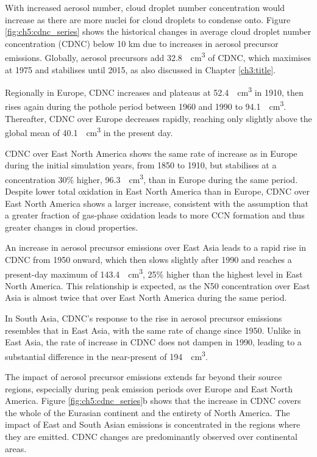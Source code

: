 With increased aerosol number, cloud droplet number concentration would increase as there are more nuclei for cloud droplets to condense onto. Figure \ref{fig:ch5:cdnc_series} shows the historical changes in average cloud droplet number concentration (CDNC) below 10 km due to increases in aerosol precursor emissions. Globally, aerosol precursors add \qty{32.8}{\per\cubic\centi\metre} of CDNC, which maximises at 1975 and stabilises until 2015, as also discussed in Chapter \ref{ch3:title}. 

Regionally in Europe, CDNC increases and plateaus at \qty{52.4}{\per\cubic\centi\metre} in 1910, then rises again during the pothole period between 1960 and 1990 to \qty{94.1}{\per\cubic\centi\metre}. Thereafter, CDNC over Europe decreases rapidly, reaching only slightly above the global mean of \qty{40.1}{\per\cubic\centi\metre} in the present day.

CDNC over East North America shows the same rate of increase as in Europe during the initial simulation years, from 1850 to 1910, but stabilises at a concentration 30\% higher, \qty{96.3}{\per\cubic\centi\metre}, than in Europe during the same period. Despite lower total oxidation in East North America than in Europe, CDNC over East North America shows a larger increase, consistent with the assumption that a greater fraction of gas-phase oxidation leads to more CCN formation and thus greater changes in cloud properties. 

An increase in aerosol precursor emissions over East Asia leads to a rapid rise in CDNC from 1950 onward, which then slows slightly after 1990 and reaches a present-day maximum of \qty{143.4}{\per\cubic\centi\metre}, 25\% higher than the highest level in East North America. This relationship is expected, as the N50 concentration over East Asia is almost twice that over East North America during the same period.

In South Asia, CDNC's response to the rise in aerosol precursor emissions resembles that in East Asia, with the same rate of change since 1950. Unlike in East Asia, the rate of increase in CDNC does not dampen in 1990, leading to a substantial difference in the near-present of \qty{194}{\per\cubic\centi\metre}.

The impact of aerosol precursor emissions extends far beyond their source regions, especially during peak emission periods over Europe and East North America. Figure \ref{fig:ch5:cdnc_series}b shows that the increase in CDNC covers the whole of the Eurasian continent and the entirety of North America. The impact of East and South Asian emissions is concentrated in the regions where they are emitted. CDNC changes are predominantly observed over continental areas. 

